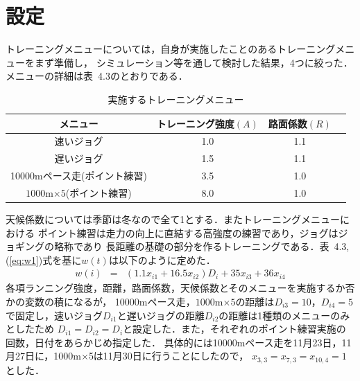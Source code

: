 \documentclass[12pt,fleqn]{jreport}
\begin{document}
\section{設定}
\vspace{1cm}
トレーニングメニューについては，自身が実施したことのあるトレーニングメニューをまず準備し，
シミュレーション等を通して検討した結果，4つに絞った．メニューの詳細は表\ 4.3のとおりである．
\newpage
\begin{longtable}{|c|c|c|c|}
  \caption{実施するトレーニングメニュー}                                   \\
  \hline
  メニュー                         & トレーニング強度$(A)$ & 路面係数$(R)$ \\
  \hline
  速いジョグ                       & 1.0                   & 1.1           \\
  \hline
  遅いジョグ                       & 1.5                   & 1.1           \\
  \hline
  10000mペース走(ポイント練習)     & 3.5                   & 1.0           \\
  \hline
  $1000$m$ \times 5$(ポイント練習) & 8.0                   & 1.0           \\
  \hline
\end{longtable}
天候係数については季節は冬なので全て1とする．またトレーニングメニューにおける
ポイント練習は走力の向上に直結する高強度の練習であり，ジョグはジョギングの略称であり
長距離の基礎の部分を作るトレーニングである．表\ 4.3,(\ref{eq:w1})式を基に$w(t)$は以下のように定めた．
\vspace{1cm}
\begin{eqnarray}
  w(i)&=&(1.1x_{i1}+16.5x_{i2})D_{i}+35x_{i3}+36x_{i4}\label{eq:w3}
\end{eqnarray}
各項ランニング強度，距離，路面係数，天候係数とそのメニューを実施するか否かの変数の積になるが，
10000mペース走，$1000$m$\times 5$の距離は$D_{i3}=10$，$D_{i4}=5$で固定し，速いジョグ$D_{i1}$と遅いジョグの距離$D_{i2}$の距離は1種類のメニューのみとしたため
$D_{i1}=D_{i2}=D_i$と設定した．また，それぞれのポイント練習実施の回数，日付をあらかじめ指定した．
具体的には10000mペース走を11月23日，11月27日に，1000m$\times$5は11月30日に行うことにしたので，
$x_{3,3}=x_{7,3}=x_{10,4}=1$とした．
\end{document}
